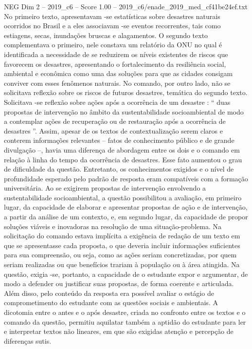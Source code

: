 \begin{textsample}{NEG Dim 2 – 2019\_c6 – Score 1.00 – 2019\_c6/enade\_2019\_med\_cf41be24ef.txt}
No primeiro texto, apresentavam -se estatísticas sobre desastres naturais ocorridos no Brasil e a eles associavam -se eventos recorrentes, tais como estiagens, secas, inundações bruscas e alagamentos.
O segundo texto complementava o primeiro, nele constava um relatório da ONU no qual é identificada a necessidade de se reduzirem os níveis existentes de riscos que favorecem os desastres, apresentando o fortalecimento da resiliência social, ambiental e econômica como uma das soluções para que as cidades consigam conviver com esses fenômenos naturais.
No comando, por outro lado, não se solicitava reflexão sobre os riscos de futuros desastres, temática do segundo texto.
Solicitava -se reflexão sobre ações após a ocorrência de um desastre : “ duas propostas de intervenção no âmbito da sustentabilidade socioambiental de modo a contemplar ações de recuperação ou de restauração após a ocorrência de desastres ”.
Assim, apesar de os textos de contextualização serem claros e conterem informações relevantes – fatos de conhecimento público e de grande divulgação –, havia uma diferença de abordagem entre os dois e o comando em relação à linha do tempo da ocorrência de desastres.
Esse fato aumentou o grau de dificuldade da questão.
Entretanto, os conhecimentos exigidos e o nível de profundidade esperado pelo padrão de resposta eram compatíveis com a formação universitária.
Ao se exigirem propostas de intervenção envolvendo a sustentabilidade socioambiental, a questão possibilitou a avaliação, em primeiro lugar, da capacidade de elaborar e apresentar propostas de ação e de intervenção, a partir da análise de um contexto, e, em segundo lugar, da capacidade de propor soluções viáveis e inovadoras na resolução de uma situação-problema.
Na solicitação do comando estava implícita a exigência de redação de um texto em que se apresentasse cada proposta, o que deveria incluir informações suficientes para sua compreensão, ou seja, como as ações seriam concretizadas, por quem seriam realizadas ou que benefícios trariam à população ou à área atingida.
Na questão, exigia -se, portanto, a capacidade de o estudante expor e argumentar, de modo a defender ou justificar suas propostas, de forma coerente e articulada.
Além disso, pelo conteúdo da resposta era possível avaliar o estágio de comprometimento do estudante com as questões sociais e ambientais.
A dicotomia entre o antes e o após desastre, criada no confronto entre os textos e o comando da questão, permitiu aquilatar também a aptidão do estudante para ler e interpretar textos não lineares, em que são exigidas atenção e percepção de diferenças sutis.

\end{textsample}
